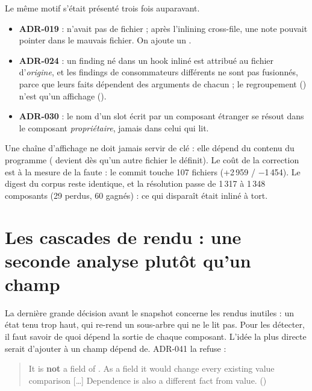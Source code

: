 Le même motif s'était présenté trois fois auparavant.
\begin{itemize}
  \item \textbf{ADR-019} :  n'avait pas de fichier ; après l'inlining cross-file, une note pouvait pointer dans le mauvais fichier. On ajoute un .
  \item \textbf{ADR-024} : un finding né dans un hook inliné est attribué au fichier d'\emph{origine}, et les findings de consommateurs différents ne sont pas fusionnés, parce que leurs faits dépendent des arguments de chacun ; le regroupement (\og \code{[in 2 components]}\fg{}) n'est qu'un affichage ().
  \item \textbf{ADR-030} : le nom d'un slot écrit par un composant étranger se résout dans le composant \emph{propriétaire}, jamais dans celui qui lit.
\end{itemize}

\begin{piege}
Une chaîne d'affichage ne doit jamais servir de clé : elle dépend du contenu du programme ( devient  dès qu'un autre fichier le définit). Le coût de la correction est à la mesure de la faute : le commit  touche 107 fichiers (+2\,959 / $-$1\,454). Le digest du corpus reste identique, et la résolution passe de 1\,317 à 1\,348 composants (29 perdus, 60 gagnés) : ce qui disparaît était inliné à tort.
\end{piege}

\section{Les cascades de rendu : une seconde analyse plutôt qu'un champ}
\label{sec:histoire-doctrine-cascades}

La dernière grande décision avant le snapshot concerne les rendus inutiles : un état tenu trop haut, qui re-rend un sous-arbre qui ne le lit pas. Pour les détecter, il faut savoir de quoi dépend la sortie de chaque composant. L'idée la plus directe serait d'ajouter à  un champ \og dépend de\fg{}. ADR-041 la refuse :

\begin{quote}\small
\og It is \textbf{not} a field of . As a field it would change every existing value comparison [\dots] Dependence is also a different fact from value.\fg{} ()
\end{quote}

